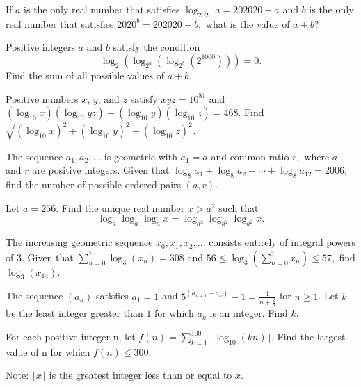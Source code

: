 \documentclass[blue,onecol]{shooting}
\begin{document}
\begin{prob}[SMT 2020]{3}
If $a$ is the only real number that satisfies $\log_{2020}a=202020-a$ and $b$ is the only real number that satisfies $2020^b=202020-b,$ what is the value of $a+b?$
\end{prob}
    
\begin{prob}[AIME II 2013/2]{3}
Positive integers $a$ and $b$ satisfy the condition \[\log_2(\log_{2^a}(\log_{2^b}(2^{1000}))) = 0.\] Find the sum of all possible values of $a+b$.
\end{prob}
    
\begin{req}[AIME II 2010/5]{3}
Positive numbers $x$, $y$, and $z$ satisfy $xyz = 10^{81}$ and $(\log_{10}x)(\log_{10} yz) + (\log_{10}y) (\log_{10}z) = 468$. Find $\sqrt {(\log_{10}x)^2 + (\log_{10}y)^2 + (\log_{10}z)^2}$.
\end{req}

\begin{prob}[AIME I 2006/9]{3}
The sequence $a_1, a_2, \ldots$ is geometric with $a_1=a$ and common ratio $r,$ where $a$ and $r$ are positive integers. Given that $\log_8 a_1+\log_8 a_2+\cdots+\log_8 a_{12} = 2006,$ find the number of possible ordered pairs $(a,r).$
\end{prob}

\begin{prob}[HMMT 2020]{4}
Let $a=256$. Find the unique real number $x>a^2$ such that
\[\log_a \log_a \log_a x = \log_{a^2} \log_{a^2} \log_{a^2} x.\]
\end{prob}

\begin{prob}[AIME II 2007/12]{4}
The increasing geometric sequence $x_{0},x_{1},x_{2},\ldots$ consists entirely of integral powers of $3.$ Given that $\sum_{n=0}^{7}\log_{3}(x_{n}) = 308$ and $56 \leq \log_{3}\left ( \sum_{n=0}^{7}x_{n}\right ) \leq 57,$ find $\log_{3}(x_{14}).$
\end{prob}

\begin{prob}[AIME I 2009/7]{4}
The sequence $(a_n)$ satisfies $a_1 = 1$ and $5^{(a_{n + 1} - a_n)} - 1 = \frac {1}{n + \frac {2}{3}}$ for $n \geq 1$. Let $k$ be the least integer greater than $1$ for which $a_k$ is an integer. Find $k$.
\end{prob}

\begin{prob}[AIME I 2010/14]{4}
For each positive integer n, let $f(n) = \sum_{k = 1}^{100} \lfloor \log_{10} (kn) \rfloor$. Find the largest value of n for which $f(n) \le 300$.

Note: $\lfloor x \rfloor$ is the greatest integer less than or equal to $x$.
\end{prob}
\end{document}
